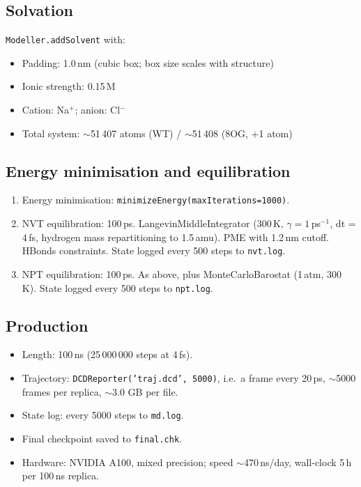 \documentclass[11pt,a4paper]{article}
\begin{document}
\subsection{Solvation}
\texttt{Modeller.addSolvent} with:
\begin{itemize}[leftmargin=*]
\item Padding: 1.0\,nm (cubic box; box size scales with structure)
\item Ionic strength: 0.15\,M
\item Cation: Na$^{+}$; anion: Cl$^{-}$
\item Total system: $\sim$51\,407 atoms (WT) / $\sim$51\,408 (8OG, +1 atom)
\end{itemize}

\subsection{Energy minimisation and equilibration}
\begin{enumerate}[leftmargin=*]
\item Energy minimisation: \texttt{minimizeEnergy(maxIterations=1000)}.
\item NVT equilibration: 100\,ps.
LangevinMiddleIntegrator (300\,K, $\gamma = 1$\,ps$^{-1}$, dt =
4\,fs, hydrogen mass repartitioning to 1.5\,amu).
PME with 1.2\,nm cutoff. HBonds constraints. State logged every 500
steps to \texttt{nvt.log}.
\item NPT equilibration: 100\,ps. As above, plus
MonteCarloBarostat (1\,atm, 300\,K). State logged every 500 steps to
\texttt{npt.log}.
\end{enumerate}

\subsection{Production}
\label{sec:run:long}
\begin{itemize}[leftmargin=*]
\item Length: 100\,ns (25\,000\,000 steps at 4\,fs).
\item Trajectory: \texttt{DCDReporter('traj.dcd', 5000)}, i.e.\ a frame
every 20\,ps, $\sim$5000 frames per replica, $\sim$3.0 GB per file.
\item State log: every 5000 steps to \texttt{md.log}.
\item Final checkpoint saved to \texttt{final.chk}.
\item Hardware: NVIDIA A100, mixed precision; speed $\sim$470\,ns/day,
wall-clock 5\,h per 100\,ns replica.
\end{itemize}
\end{document}
